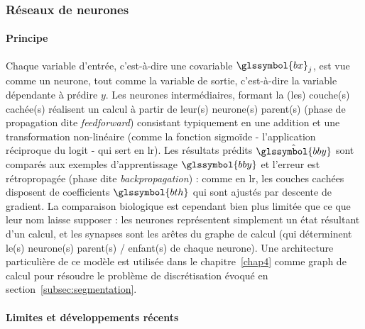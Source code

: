 \subsubsection{Réseaux de neurones}

\paragraph{Principe}

Chaque variable d'entrée, c'est-à-dire une covariable $\glssymbol{bx}_j$, est vue comme un neurone, tout comme la variable de sortie, c'est-à-dire la variable dépendante à prédire $y$. Les neurones intermédiaires, formant la (les) couche(s) cachée(s) réalisent un calcul à partir de leur(s) neurone(s) parent(s) (phase de propagation dite \textit{feedforward}) consistant typiquement en une addition et une transformation non-linéaire (comme la fonction  sigmoïde - l'application réciproque du logit - qui sert en \gls{lr}). Les résultats prédits $\hat{\glssymbol{bby}}$ sont comparés aux exemples d'apprentissage $\glssymbol{bby}$ et l'erreur est rétropropagée (phase dite \textit{backpropagation}) : comme en \gls{lr}, les couches cachées disposent de coefficients $\glssymbol{bth}$ qui sont ajustés par descente de gradient. La comparaison biologique est cependant bien plus limitée que ce que leur nom laisse supposer : les neurones représentent simplement un état résultant d'un calcul, et les synapses sont les arêtes du graphe de calcul (qui déterminent le(s) neurone(s) parent(s) / enfant(s) de chaque neurone). Une architecture particulière de ce modèle est utilisée dans le chapitre~\ref{chap4} comme graph de calcul pour résoudre le problème de discrétisation évoqué en section~\ref{subsec:segmentation}.

\paragraph{Limites et développements récents}

